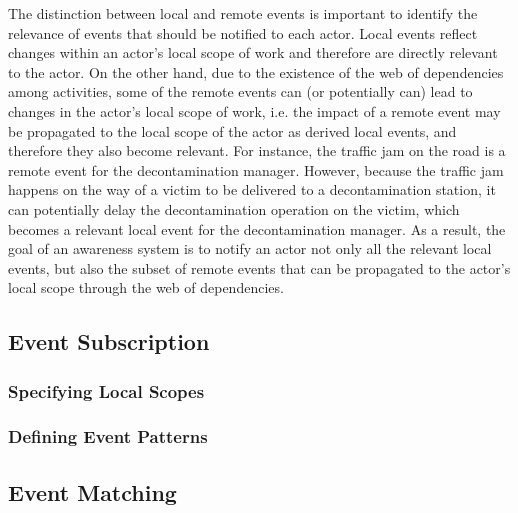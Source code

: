 The distinction between local and remote events is important to identify the relevance of events that should be notified to each actor. Local events reflect changes within an actor’s local scope of work and therefore are directly relevant to the actor. On the other hand, due to the existence of the web of dependencies among activities, some of the remote events can (or potentially can) lead to changes in the actor’s local scope of work, i.e. the impact of a remote event may be propagated to the local scope of the actor as derived local events, and therefore they also become relevant. For instance, the traffic jam on the road is a remote event for the decontamination manager. However, because the traffic jam happens on the way of a victim to be delivered to a decontamination station, it can potentially delay the decontamination operation on the victim, which becomes a relevant local event for the decontamination manager. As a result, the goal of an awareness system is to notify an actor not only all the relevant local events, but also the subset of remote events that can be propagated to the actor’s local scope through the web of dependencies. 


\subsection{Event Subscription} %
\label{sub:event_subscription}
\subsubsection{Specifying Local Scopes} %
\label{ssub:specifying_local_scopes}


\subsubsection{Defining Event Patterns} %
\label{ssub:defining_event_patterns}


\subsection{Event Matching} %
\label{sub:event_matching}

